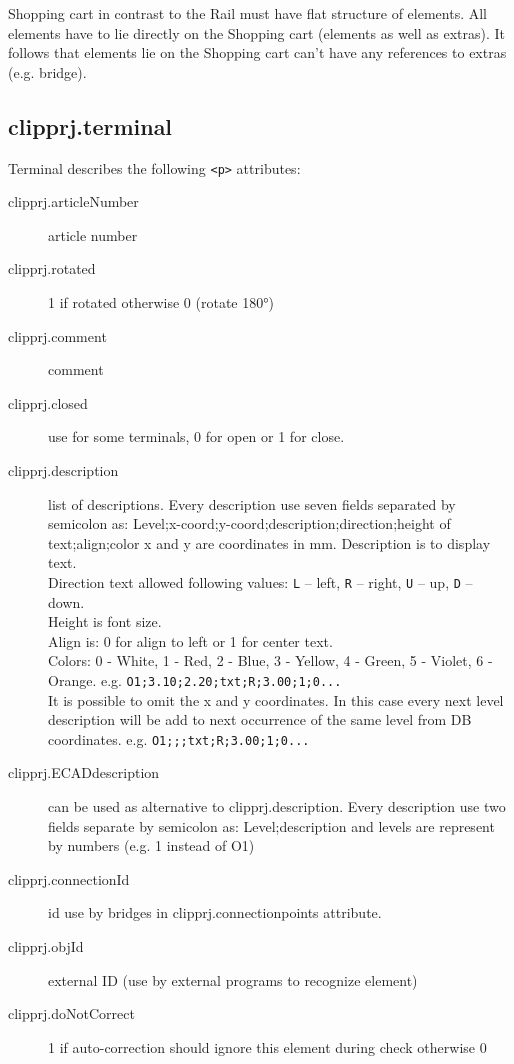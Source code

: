\documentclass[%
	a4paper,
	oneside,
	listof=numbered,
	parskip=half,
	headsepline=true,
	footsepline=false,
	normalheadings,
	0.7headlines,
	headexclude,
	]{scrbook}
\begin{document}
Shopping cart in contrast to the Rail must have flat structure of elements. All elements have to lie directly on the Shopping cart (elements as well as extras). It follows that elements lie on the Shopping cart can’t have any references to extras (e.g. bridge). 

\subsection{clipprj.terminal} 
 
Terminal describes the following \verb|<p>| attributes: 

\begin{description}
	\item[clipprj.articleNumber] article number 
	\item[clipprj.rotated] 1 if rotated otherwise 0 (rotate 180°) 
	\item[clipprj.comment] comment 
	\item[clipprj.closed] use for some terminals, 0 for open or 1 for close. 
	\item[clipprj.description] list of descriptions. Every description use seven fields separated by semicolon as: Level;x-coord;y-coord;description;direction;height of text;align;color x and y are coordinates in mm.
	Description is to display text.\\
	Direction text allowed following values: 
	\verb|L| – left, \verb|R| – right, \verb|U| – up, \verb|D| – down.\\
	Height is font size.\\
	Align is: 0 for align to left or 1 for center text.\\
	Colors: 0 - White, 1 - Red, 2 - Blue, 3 - Yellow, 4 - Green, 5 - Violet, 6 - Orange. e.g. \verb|O1;3.10;2.20;txt;R;3.00;1;0...|\\
	It is possible to omit the x and y coordinates. In this case every next level description will be add to next occurrence of the same level from DB coordinates. e.g. \verb|O1;;;txt;R;3.00;1;0...|
	\item[clipprj.ECADdescription] can be used as alternative to clipprj.description. Every description use two fields separate by semicolon as: Level;description and levels are represent by numbers (e.g. 1 instead of O1) 
	\item[clipprj.connectionId] id use by bridges in clipprj.connectionpoints attribute. 
	\item[clipprj.objId] external ID (use by external programs to recognize element) 
	\item[clipprj.doNotCorrect] 1 if auto-correction should ignore this element during check otherwise 0 
\end{description}
\end{document}
